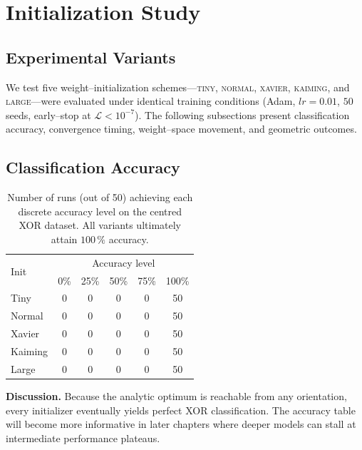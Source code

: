 ﻿%

\section{Initialization Study}
\label{sec:abs1-init}

\subsection*{Experimental Variants}
We test five weight–initialization schemes—\textsc{tiny}, \textsc{normal},
\textsc{xavier}, \textsc{kaiming}, and \textsc{large}—were evaluated under
identical training conditions (Adam, $lr=0.01$, $50$ seeds, early–stop at
$\mathcal L<10^{-7}$).  The following subsections present classification
accuracy, convergence timing, weight–space movement, and geometric outcomes.

\subsection*{Classification Accuracy}

\begin{table}[h]
\centering
\caption{Number of runs (out of 50) achieving each discrete accuracy level
on the centred XOR dataset.  All variants ultimately attain $100\,\%$
accuracy.}
\label{tab:init-accuracy}
\begin{tabular}{lccccc}
\toprule
\multirow{2}{*}{Init} & \multicolumn{5}{c}{Accuracy level}\\
\cmidrule(lr){2-6}
 & 0\% & 25\% & 50\% & 75\% & 100\% \\
\midrule
Tiny    & 0 & 0 & 0 & 0 & 50 \\
Normal  & 0 & 0 & 0 & 0 & 50 \\
Xavier  & 0 & 0 & 0 & 0 & 50 \\
Kaiming & 0 & 0 & 0 & 0 & 50 \\
Large   & 0 & 0 & 0 & 0 & 50 \\
\bottomrule
\end{tabular}
\end{table}

\textbf{Discussion.}  
Because the analytic optimum is reachable from any orientation, every
initializer eventually yields perfect XOR classification.  The accuracy table
will become more informative in later chapters where deeper models can stall
at intermediate performance plateaus.

